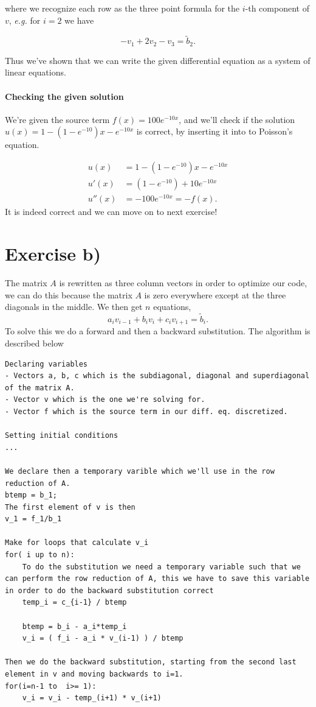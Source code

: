 \documentclass[english, 11pt]{article}
\begin{document}
where we recognize each row as the three point formula for the $i$-th component of $v$, \emph{e.g.} for $i=2$ we have

$$ -v_1 + 2v_2 -v_3 = \tilde b_2.$$

Thus we've shown that we can write the given differential equation as a system of linear equations.

\paragraph{Checking the given solution}
We're given the source term $f(x) = 100 e^{-10x}$, and we'll check if the solution $u(x) = 1-(1-e^{-10})x - e^{-10x}$ is correct, by inserting it into to Poisson's equation.

\begin{align*}
	u(x) &= 1-(1-e^{-10})x - e^{-10x} \\
	u'(x) &= (1-e^{-10}) + 10e^{-10x} \\
	u''(x) &= - 100e^{-10x} = -f(x).
\end{align*}
It is indeed correct and we can move on to next exercise!

\section*{Exercise b)}

The matrix $ A$ is rewritten as three column vectors in order to optimize our code, we can do this because the matrix $A$ is zero everywhere except at the three diagonals in the middle. We then get $n$ equations,
$$ a_i v_{i-1} + b_iv_i + c_i v_{i+1} = \tilde b_i.$$
To solve this we do a forward and then a backward substitution. The algorithm is described below

\begin{lstlisting}
Declaring variables
- Vectors a, b, c which is the subdiagonal, diagonal and superdiagonal of the matrix A.
- Vector v which is the one we're solving for.
- Vector f which is the source term in our diff. eq. discretized.

Setting initial conditions
...

We declare then a temporary varible which we'll use in the row reduction of A.
btemp = b_1;
The first element of v is then
v_1 = f_1/b_1

Make for loops that calculate v_i
for( i up to n):
    To do the substitution we need a temporary variable such that we can perform the row reduction of A, this we have to save this variable in order to do the backward substitution correct
    temp_i = c_{i-1} / btemp

    btemp = b_i - a_i*temp_i
    v_i = ( f_i - a_i * v_(i-1) ) / btemp

Then we do the backward substitution, starting from the second last element in v and moving backwards to i=1.
for(i=n-1 to  i>= 1):
    v_i = v_i - temp_(i+1) * v_(i+1)
\end{lstlisting}
\end{document}
